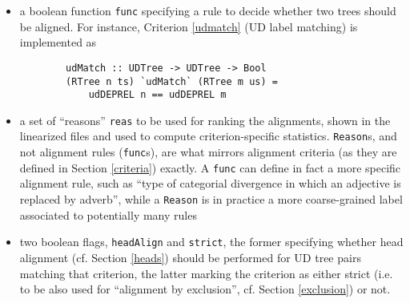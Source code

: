 \begin{itemize}
    \item a boolean function \texttt{func} specifying a rule to decide whether two trees should be aligned. For instance, Criterion \ref{udmatch} (UD label matching) is implemented as
    \begin{lstlisting}
        udMatch :: UDTree -> UDTree -> Bool
        (RTree n ts) `udMatch` (RTree m us) = 
            udDEPREL n == udDEPREL m
    \end{lstlisting}
    \item a set of ``reasons'' \texttt{reas} to be used for ranking the alignments, shown in the linearized files and used to compute criterion-specific statistics. \texttt{Reason}s, and not alignment rules (\texttt{func}s), are what mirrors alignment criteria (as they are defined in Section \ref{criteria}) exactly. A \texttt{func} can define in fact a more specific alignment rule, such as ``type of categorial divergence in which an adjective is replaced by adverb'', while a \texttt{Reason} is in practice a more coarse-grained label associated to potentially many rules
    \item two boolean flags, \texttt{headAlign} and \texttt{strict}, the former specifying whether head alignment (cf. Section \ref{heads}) should be performed for UD tree pairs matching that criterion, the latter marking the criterion as either strict (i.e. to be also used for ``alignment by exclusion'', cf. Section \ref{exclusion}) or not.
\end{itemize}